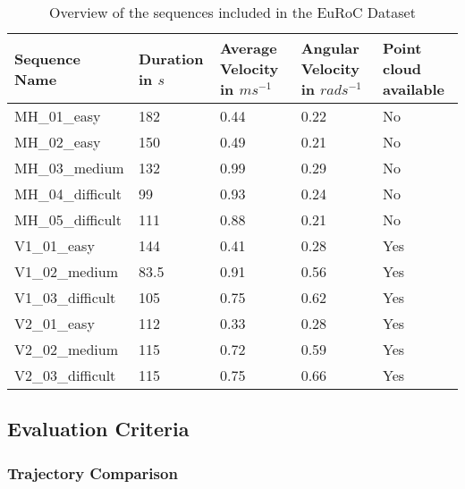 	\begin{table}
	\caption{Overview of the sequences included in the EuRoC Dataset}
	\begin{tabular}{ |p{3cm}||p{3cm}|p{2cm}|p{2cm}|p{3cm}|}
	\hline
	Sequence Name& Duration in $s$ & Average Velocity in $ms^{-1}$ & Angular Velocity in $rad s^{-1}$ &Point cloud available\\
	\hline
	MH\_01\_easy & 182 & 0.44 & 0.22 & No\\
	MH\_02\_easy & 150 & 0.49 & 0.21 &No\\
	MH\_03\_medium & 132 & 0.99 & 0.29 & No\\
	MH\_04\_difficult & 99 & 0.93 & 0.24 & No\\
	MH\_05\_difficult & 111 & 0.88 & 0.21 & No\\
	V1\_01\_easy & 144 & 0.41 & 0.28 & Yes\\
	V1\_02\_medium & 83.5 & 0.91 & 0.56 & Yes\\
	V1\_03\_difficult & 105 & 0.75 & 0.62 & Yes\\
	V2\_01\_easy & 112 & 0.33 & 0.28 & Yes\\
	V2\_02\_medium & 115 & 0.72 & 0.59 & Yes\\
	V2\_03\_difficult & 115 & 0.75 & 0.66 & Yes\\
	\hline
	\end{tabular}
	\label{table:euroctable}
	\end{table}

\subsection{Evaluation Criteria}
\subsubsection{Trajectory Comparison}

